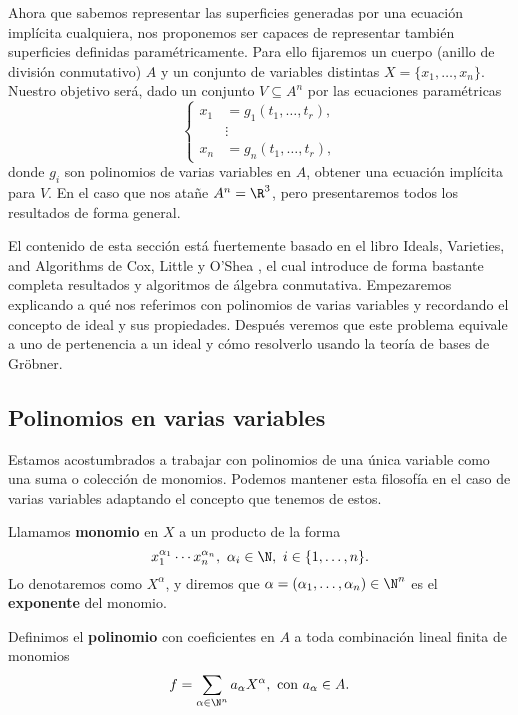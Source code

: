 Ahora que sabemos representar las superficies generadas por una ecuación implícita cualquiera, nos proponemos ser capaces de representar también superficies definidas paramétricamente. Para ello fijaremos un cuerpo (anillo de división conmutativo) $A$ y un conjunto de variables distintas $X=\{x_1,\dots, x_n\}$. Nuestro objetivo será, dado un conjunto $V\subseteq A^n$ por las ecuaciones paramétricas
\begin{equation*}
    \begin{cases*}
    x_1 &= g_1(t_1,\dots, t_r),\\
    &\vdots \\
    x_n &= g_n(t_1,\dots, t_r),
\end{cases*}
\end{equation*}
donde $g_i$ son polinomios de varias variables en $A$, obtener una ecuación implícita para $V$. En el caso que nos atañe $A^n=\R^3$, pero presentaremos todos los resultados de forma general.\newline

El contenido de esta sección está fuertemente basado en el libro Ideals, Varieties, and Algorithms de Cox, Little y O'Shea \cite{ideals_varieties}, el cual introduce de forma bastante completa resultados y algoritmos de álgebra conmutativa. Empezaremos explicando a qué nos referimos con polinomios de varias variables y recordando el concepto de ideal y sus propiedades. Después veremos que este problema equivale a uno de pertenencia a un ideal y cómo resolverlo usando la teoría de bases de Gröbner.

\subsection{Polinomios en varias variables}
Estamos acostumbrados a trabajar con polinomios de una única variable como una suma o colección de monomios. Podemos mantener esta filosofía en el caso de varias variables adaptando el concepto que tenemos de estos.

\begin{definicion}
    Llamamos \textbf{monomio} en $X$ a un producto de la forma
    $$x_1^{\alpha_1} \cdots x_n^{\alpha_n},\ \alpha_i \in \N,\ i\in\{1,\dots, n\}.$$
    Lo denotaremos como $X^{\alpha}$, y diremos que $\alpha = (\alpha_1,\dots, \alpha_n)\in \N^n$ es el \textbf{exponente} del monomio.
\end{definicion}

\begin{definicion}
    Definimos el \textbf{polinomio} con coeficientes en $A$ a toda combinación lineal finita de monomios
    \begin{align*}
        f = \sum_{\alpha\in \N^n} a_{\alpha} X^{\alpha}, \text{ con } a_{\alpha} \in A.
    \end{align*}

\end{definicion}

